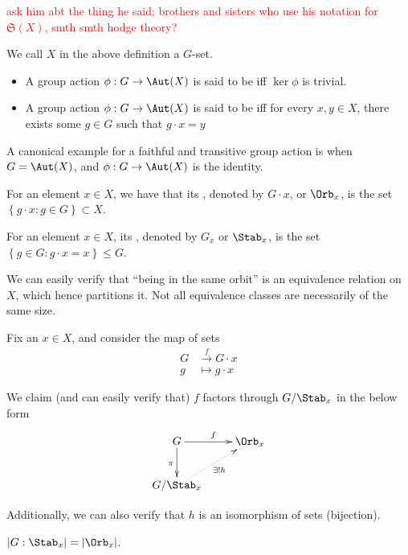 \documentclass[12pt]{scrartcl}
\begin{document}
\textcolor{red}{ask him abt the thing he said; brothers and sisters who use his notation for $\mathfrak{S}(X)$, smth smth hodge theory?}

We call $X$ in the above definition a $G$-set.


	\begin{itemize}
		\item A group action $\phi: G \to \Aut(X)$ is said to be  iff $\ker{\phi}$ is trivial. 
		\item A group action $\phi: G \to \Aut(X)$ is said to be  iff for every $x, y \in X$, there exists some $g \in G$ such that $g \cdot x = y$   
	\end{itemize}
	\begin{example}
A canonical example for a faithful and transitive group action is when $G = \Aut(X)$, and $\phi: G \to \Aut(X)$ is the identity.
	\end{example}

	\begin{definition}[Orbit]
	For an element $x \in X$, we have that its , denoted by $G \cdot x$, or $\Orb_x$, is the set $\left\{g \cdot x: g \in G\right\} \subset X$.
	\end{definition}
	
	\begin{definition}[Stabiliser]
For an element $x \in X$, its , denoted by $G_x$ or $\Stab_x$, is the set $\left\{g \in G: g \cdot x = x\right\} \leq G$.
\end{definition}
We can easily verify that ``being in the same orbit'' is an equivalence relation on $X$, which hence partitions it.
Not all equivalence classes are necessarily of the same size.

Fix an $x \in X$, and consider the map of sets
\begin{align*}
	G &\xrightarrow{f} G \cdot x\\
	g &\mapsto g \cdot x
\end{align*}

\begin{proposition}
	\label{s1.1}
We claim (and can easily verify that) $f$ factors through $G/ \Stab_x$ in the below form 
\[
\begin{array}{c}
	\xymatrix{
		G \ar[r]^f \ar[d]_{\pi}	& \Orb_x\\
		G/\Stab_x \ar@{.>}[ur]_{\exists! h} 
	}
\end{array}
\]
\end{proposition}
Additionally, we can also verify that $h$ is an isomorphism of sets (bijection).
\begin{corollary}
	\label{s1.2}
$|G: \Stab_x| = |\Orb_x|$.
\end{corollary}
\end{document}
